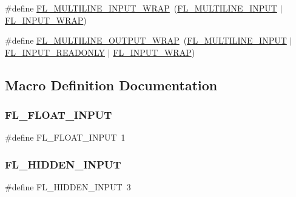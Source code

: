 \begin{DoxyCompactItemize}
\item 
\#define \hyperlink{_fl___input___8_h_a986aa08e8df35c43b32cb152c815a61f}{F\+L\+\_\+\+M\+U\+L\+T\+I\+L\+I\+N\+E\+\_\+\+I\+N\+P\+U\+T\+\_\+\+W\+R\+AP}~(\hyperlink{_fl___input___8_h_a2ed63532f4c72ef6b90e256f46cdbe28}{F\+L\+\_\+\+M\+U\+L\+T\+I\+L\+I\+N\+E\+\_\+\+I\+N\+P\+UT} $\vert$ \hyperlink{_fl___input___8_h_a570188ba3b53678cf16054330c7cf8f5}{F\+L\+\_\+\+I\+N\+P\+U\+T\+\_\+\+W\+R\+AP})
\item 
\#define \hyperlink{_fl___input___8_h_a93d70d91518bbe5c1fa5dde150c65bc5}{F\+L\+\_\+\+M\+U\+L\+T\+I\+L\+I\+N\+E\+\_\+\+O\+U\+T\+P\+U\+T\+\_\+\+W\+R\+AP}~(\hyperlink{_fl___input___8_h_a2ed63532f4c72ef6b90e256f46cdbe28}{F\+L\+\_\+\+M\+U\+L\+T\+I\+L\+I\+N\+E\+\_\+\+I\+N\+P\+UT} $\vert$ \hyperlink{_fl___input___8_h_a351f637977c53f1ba249f97f2b0a1c23}{F\+L\+\_\+\+I\+N\+P\+U\+T\+\_\+\+R\+E\+A\+D\+O\+N\+LY} $\vert$ \hyperlink{_fl___input___8_h_a570188ba3b53678cf16054330c7cf8f5}{F\+L\+\_\+\+I\+N\+P\+U\+T\+\_\+\+W\+R\+AP})
\end{DoxyCompactItemize}


\subsection{Macro Definition Documentation}
\mbox{\label{_fl___input___8_h_a0a167f1c5c15a35af88fa997e84d1c85}} 
\subsubsection{\texorpdfstring{F\+L\+\_\+\+F\+L\+O\+A\+T\+\_\+\+I\+N\+P\+UT}{FL\_FLOAT\_INPUT}}
{\footnotesize\ttfamily \#define F\+L\+\_\+\+F\+L\+O\+A\+T\+\_\+\+I\+N\+P\+UT~1}

\mbox{\label{_fl___input___8_h_a3c6c6190accbcfecb28e53426fafd1b5}} 
\subsubsection{\texorpdfstring{F\+L\+\_\+\+H\+I\+D\+D\+E\+N\+\_\+\+I\+N\+P\+UT}{FL\_HIDDEN\_INPUT}}
{\footnotesize\ttfamily \#define F\+L\+\_\+\+H\+I\+D\+D\+E\+N\+\_\+\+I\+N\+P\+UT~3}


